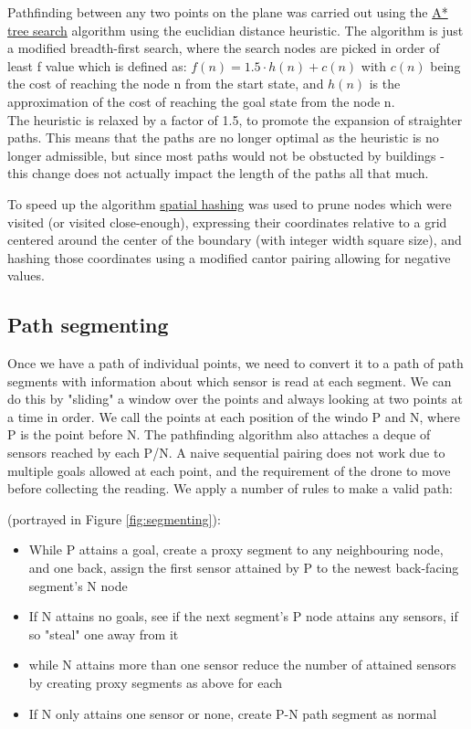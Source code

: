 \documentclass[10pt,a4paper]{article}
\begin{document}
Pathfinding between any two points on the plane was carried out using the \hyperref[tab:AstarTreeSearch]{\color{blue}A* tree search} algorithm using the euclidian distance heuristic. 
The algorithm is just a modified breadth-first search, where the search nodes are picked in order of least f value which is defined as:
    $f(n) = 1.5 \cdot h(n) + c(n)$
with $c(n)$ being the cost of reaching the node n from the start state, and $h(n)$ is the approximation of the cost of reaching the goal state from the node n.
\\

\noindent The heuristic is relaxed by a factor of 1.5, to promote the expansion of straighter paths.
\noindent This means that the paths are no longer optimal as the heuristic is no longer admissible, but since most paths would not be obstucted by buildings - this
change does not actually impact the length of the paths all that much.

To speed up the algorithm \hyperref[tab:GridSnappingSpatialHash]{\color{blue}spatial hashing} was used to prune nodes which were visited (or visited close-enough), expressing their coordinates relative to a grid centered around the center of the boundary (with integer width square size), and hashing those coordinates
using a modified cantor pairing allowing for negative values.

\subsection{Path segmenting}
Once we have a path of individual points, we need to convert it to a path of path segments with information about which sensor is read at each segment.
We can do this by "sliding" a window over the points and always looking at two points at a time in order. 
We call the points at each position of the windo P and N, where P is the point before N. 
The pathfinding algorithm also attaches a deque of sensors reached by each P/N.  
A naive sequential pairing does not work due to multiple goals allowed at each point, and the requirement of the drone to move before collecting the reading.
We apply a number of rules to make a valid path:

\noindent (portrayed in Figure \ref{fig:segmenting}):
\begin{itemize}
    \item While P attains a goal, create a proxy segment to any neighbouring node, and one back, assign the first sensor attained by P 
        to the newest back-facing segment's N node
    \item If N attains no goals, see if the next segment's P node attains any sensors, if so "steal" one away from it
    \item while N attains more than one sensor reduce the number of attained sensors by creating proxy segments as above for each
    \item If N only attains one sensor or none, create P-N path segment as normal
\end{itemize}
\end{document}
